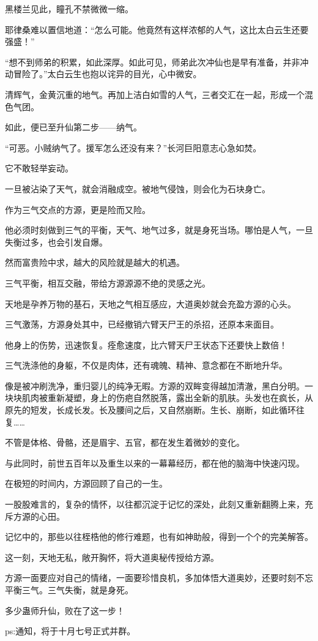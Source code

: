 \begin{this_body}
黑楼兰见此，瞳孔不禁微微一缩。

耶律桑难以置信地道：“怎么可能。他竟然有这样浓郁的人气，这比太白云生还要强盛！”

“想不到师弟的积累，如此深厚。如此可见，师弟此次冲仙也是早有准备，并非冲动冒险了。”太白云生也抱以诧异的目光，心中微安。

清辉气，金黄沉重的地气。再加上洁白如雪的人气，三者交汇在一起，形成一个混色气团。

如此，便已至升仙第二步——纳气。

“可恶。小贼纳气了。援军怎么还没有来？”长河巨阳意志心急如焚。

它不敢轻举妄动。

一旦被沾染了天气，就会消融成空。被地气侵蚀，则会化为石块身亡。

作为三气交点的方源，更是险而又险。

他必须时刻做到三气的平衡，天气、地气过多，就是身死当场。哪怕是人气，一旦失衡过多，也会引发自爆。

然而富贵险中求，越大的风险就是越大的机遇。

三气平衡，相互交融，带给方源源源不绝的灵感之光。

天地是孕养万物的基石，天地之气相互感应，大道奥妙就会充盈方源的心头。

三气激荡，方源身处其中，已经撤销六臂天尸王的杀招，还原本来面目。

他身上的伤势，迅速恢复。痊愈速度，比六臂天尸王状态下还要快上数倍！

三气洗涤他的身躯，不仅是肉体，还有魂魄、精神、意念都在不断地升华。

像是被冲刷洗净，重归婴儿的纯净无暇。方源的双眸变得越加清澈，黑白分明。一块块肌肉被重新凝塑，身上的伤疤自然脱落，露出全新的肌肤。头发也在疯长，从原先的短发，长成长发。长及腰间之后，又自然崩断。生长、崩断，如此循环往复……

不管是体格、骨骼，还是眉宇、五官，都在发生着微妙的变化。

与此同时，前世五百年以及重生以来的一幕幕经历，都在他的脑海中快速闪现。

在极短的时间内，方源回顾了自己的一生。

一股股难言的，复杂的情怀，以往都沉淀于记忆的深处，此刻又重新翻腾上来，充斥方源的心田。

记忆中的，那些以往桎梏他的修行难题，也有如神助般，得到一个个的完美解答。

这一刻，天地无私，敞开胸怀，将大道奥秘传授给方源。

方源一面要应对自己的情绪，一面要珍惜良机，多加体悟大道奥妙，还要时刻不忘平衡三气。三气失衡，就是身死。

多少蛊师升仙，败在了这一步！

ps:通知，将于十月七号正式并群。

\end{this_body}

